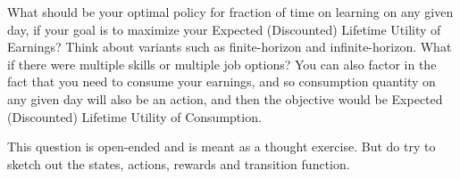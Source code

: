 \documentclass[12pt]{exam}
\begin{document}
\begin{questions}
What should be your optimal policy for fraction of time on learning on any given day, if your goal is to maximize your Expected (Discounted) Lifetime Utility of Earnings?
Think about variants such as finite-horizon and infinite-horizon. What if there were multiple skills or multiple job options? You can also factor in the fact that you need to consume your earnings, and so consumption quantity on any given day will also be an action, and then the objective would be Expected (Discounted) Lifetime Utility of Consumption.

This question is open-ended and is meant as a thought exercise. But do try to sketch out the states, actions, rewards and transition function.

\end{questions}
\end{document}
